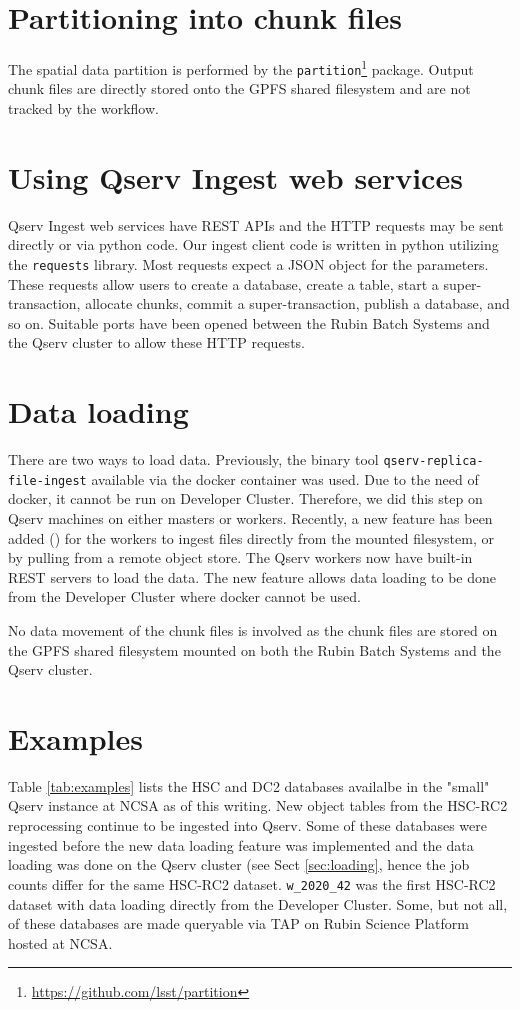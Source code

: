 \section{Partitioning into chunk files}
The spatial data partition is performed by the \texttt{partition}\footnote{\url{https://github.com/lsst/partition}} package.
Output chunk files are directly stored onto the GPFS shared filesystem and are not tracked by the workflow.


\section{Using Qserv Ingest web services}
Qserv Ingest web services have REST APIs and the HTTP requests may be sent directly or via python code.
Our ingest client code is written in python utilizing the \texttt{requests} library.
Most requests expect a JSON object for the parameters.
These requests allow users to create a database, create a table, start a super-transaction, allocate chunks, commit a super-transaction, publish a database, and so on.
Suitable ports have been opened between the Rubin Batch Systems and the Qserv cluster to allow these HTTP requests.


\label{sec:loading}
\section{Data loading}
There are two ways to load data.
Previously, the binary tool \texttt{qserv-replica-file-ingest} available via the docker container was used. Due to the need of docker, it cannot be run on Developer Cluster. Therefore, we did this step on Qserv machines on either masters or workers.
Recently, a new feature has been added () for the workers to ingest files directly from the mounted filesystem, or by pulling from a remote object store. The Qserv workers now have built-in REST servers to load the data.  The new feature allows data loading to be done from the Developer Cluster where docker cannot be used.

No data movement of the chunk files is involved as the chunk files are stored on the GPFS shared filesystem mounted on both the Rubin Batch Systems and the Qserv cluster.

\section{Examples}
Table \ref{tab:examples} lists the HSC and DC2 databases availalbe in the "small" Qserv instance at NCSA as of this writing.
New object tables from the HSC-RC2 reprocessing continue to be ingested into Qserv.
Some of these databases were ingested before the new data loading feature was implemented and the data loading was done on the Qserv cluster (see Sect \ref{sec:loading}, hence the job counts differ for the same HSC-RC2 dataset.
\texttt{w\_2020\_42} was the first HSC-RC2 dataset with data loading directly from the Developer Cluster.
Some, but not all, of these databases are made queryable via TAP on Rubin Science Platform hosted at NCSA.



